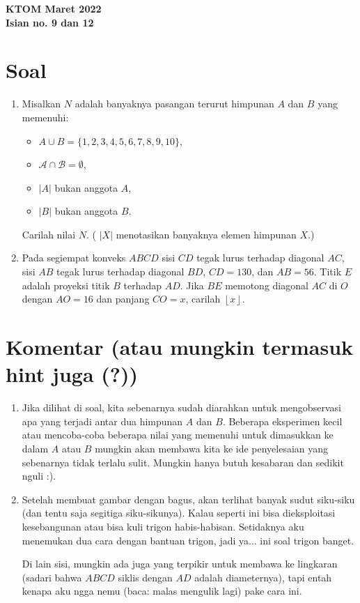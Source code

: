 \begin{center}
    \textbf{\Huge \vspace{-2cm}\textcolor{Red!80}{K}\textcolor{Green!80}{T}\textcolor{Blue!70}{O}\textcolor{YellowOrange!80}{M} Maret 2022}\\
    \textbf{\large \vspace{-1.5cm}Isian no. 9 dan 12}
\end{center}


\vspace{-1.5cm}
\section{Soal}
\begin{enumerate}
\item Misalkan $N$ adalah banyaknya pasangan terurut himpunan $A$ dan $B$ yang memenuhi:
\begin{itemize}
\item $A \cup B = \{1,2,3,4,5,6,7,8,9,10\}$,
\item $\mathcal{A} \cap \mathcal{B} = \emptyset$,
\item $|A|$ bukan anggota $A$,
\item $|B|$ bukan anggota $B$.
\end{itemize}
Carilah nilai $N$. ( $|X|$ menotasikan banyaknya elemen himpunan $X$.)

\item Pada segiempat konveks $ABCD$ sisi $CD$ tegak lurus terhadap diagonal $AC$, sisi $AB$ tegak lurus terhadap diagonal $BD$, $CD = 130$, dan $AB = 56$. Titik $E$ adalah proyeksi titik $B$ terhadap $AD$. Jika $BE$ memotong diagonal $AC$ di $O$ dengan $AO = 16$ dan panjang $CO = x$, carilah $\left \lfloor x \right \rfloor$.
\end{enumerate}

\newpage
\section{Komentar (atau mungkin termasuk hint juga (?))}
\begin{enumerate}
\item[\textbf{No. 1}] Jika dilihat di soal, kita sebenarnya sudah diarahkan untuk mengobservasi apa yang terjadi antar dua himpunan $A$ dan $B$. Beberapa eksperimen kecil atau mencoba-coba beberapa nilai yang memenuhi untuk dimasukkan ke dalam $A$ atau $B$ mungkin akan membawa kita ke ide penyelesaian yang sebenarnya tidak terlalu sulit. Mungkin hanya butuh kesabaran dan sedikit nguli :).

\item[\textbf{No. 2}] Setelah membuat gambar dengan bagus, akan terlihat banyak sudut siku-siku (dan tentu saja segitiga siku-sikunya). Kalau seperti ini bisa dieksploitasi kesebangunan atau bisa kuli trigon habis-habisan. Setidaknya aku menemukan dua cara dengan bantuan trigon, jadi ya... ini soal trigon banget.

Di lain sisi, mungkin ada juga yang terpikir untuk membawa ke lingkaran (sadari bahwa $ABCD$ siklis dengan $AD$ adalah diameternya), tapi entah kenapa aku ngga nemu (baca: malas mengulik lagi) pake cara ini.
\end{enumerate}

